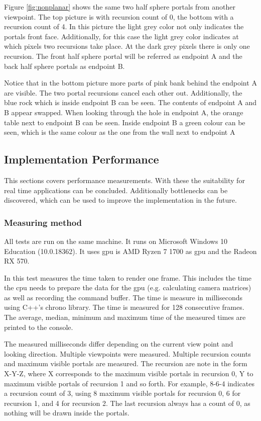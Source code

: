 Figure \ref{fig:nonplanar} shows the same two half sphere portals from another viewpoint. The top picture is with recursion count of 0, the bottom with a recursion count of 4. In this picture the light grey color not only indicates the portals front face. Additionally, for this case the light grey color indicates at which pixels two recursions take place. At the dark grey pixels there is only one recursion. The front half sphere portal will be referred as \gls{endpoint} A and the back half sphere portals as \gls{endpoint} B.

Notice that in the bottom picture more parts of pink bank behind the \gls{endpoint} A are visible. The two portal recursions cancel each other out. Additionally, the blue rock which is inside \gls{endpoint} B can be seen. The contents of \gls{endpoint} A and B appear swapped. When looking through the hole in \gls{endpoint} A, the orange table next to \gls{endpoint} B can be seen. Inside \gls{endpoint} B a green colour can be seen, which is the same colour as the one from the wall next to \gls{endpoint} A

\subsection{Implementation Performance}

This sections covers performance measurements. With these the suitability for real time applications can be concluded. Additionally bottlenecks can be discovered, which can be used to improve the implementation in the future.

\subsubsection{Measuring method}
All tests are run on the same machine. It runs on Microsoft Windows 10 Education (10.0.18362). It uses \gls{gpu} is AMD Ryzen 7 1700 as \gls{gpu} and the Radeon RX 570.

In this test measures the time taken to render one frame. This includes the time the \gls{cpu} needs to prepare the data for the \gls{gpu} (e.g. calculating camera matrices) as well as recording the command buffer. The time is measure in milliseconds using C++'s chrono library. The time is measured for 128 consecutive frames. The average, median, minimum and maximum time of the measured times are printed to the console.


The measured milliseconds differ depending on the current view point and looking direction. Multiple viewpoints were measured. Multiple recursion counts and maximum visible portals are measured. The recursion are note in the form  X-Y-Z, where X corresponds to the maximum visible portals in recursion 0, Y to maximum visible portals of recursion 1 and so forth. For example, 8-6-4 indicates a recursion count of 3, using 8 maximum visible portals for recursion 0, 6 for recursion 1, and 4 for recursion 2. The last recursion always has a count of 0, as nothing will be drawn inside the portals. 

